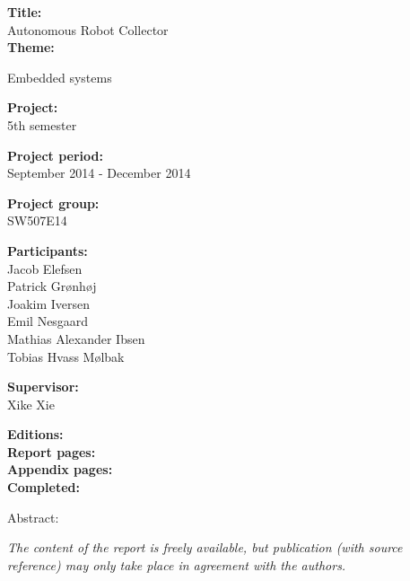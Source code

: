 \begin{minipage}[t]{0.48\textwidth}
\textbf{Title:} \\[5pt]\bigskip\hspace{2ex}
Autonomous Robot Collector\\
\textbf{Theme:} \\[5pt]\bigskip\hspace{2ex}
\parbox{6.6 cm}{
Embedded systems}

\textbf{Project:} \\[5pt]\bigskip\hspace{2ex}
5th semester

\textbf{Project period:} \\[5pt]\bigskip\hspace{2ex}
September 2014 - December 2014

\textbf{Project group:} \\[5pt]\bigskip\hspace{2ex}
SW507E14

\textbf{Participants:} \\[5pt]\hspace*{2ex}
Jacob Elefsen \\\hspace*{2ex}
Patrick Grønhøj \\\hspace*{2ex}
Joakim Iversen \\\hspace*{2ex}
Emil Nesgaard \\\hspace*{2ex}
Mathias Alexander Ibsen \\\hspace*{2ex}
Tobias Hvass Mølbak \\\bigskip\hspace{2ex}

\textbf{Supervisor:} \\[5pt]\hspace*{2ex}
Xike Xie
\vspace*{1cm}

\textbf{Editions: } \\
\textbf{Report pages: \pageref{LastPage}} \\
\textbf{Appendix pages: } \\
\textbf{Completed: }

\end{minipage}
\hfill
\begin{minipage}[t]{0.48\textwidth}
Abstract: \\[5pt]
\fbox{\parbox{7cm}{\bigskip\bigskip}}
\end{minipage}

\vfill

{\footnotesize\itshape The content of the report is freely available, but publication (with source reference) may only take place in agreement with the authors.}

